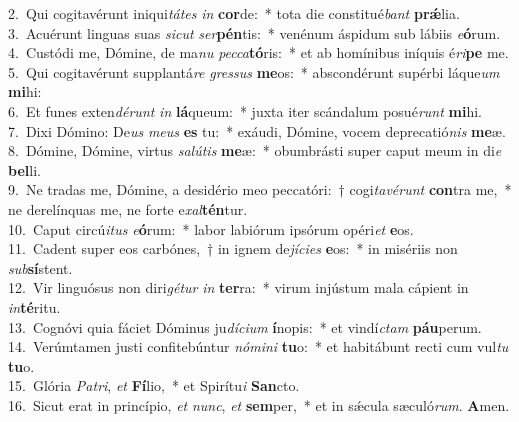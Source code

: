 {2.~}Qui cogitavérunt iniqui\textit{tá}\textit{tes} \textit{in} \textbf{cor}de:~* tota die constitué\textit{bant} \textbf{prǽ}lia.\\
{3.~}Acuérunt linguas suas \textit{si}\textit{cut} \textit{ser}\textbf{pén}tis:~* venénum áspidum sub lábiis \textit{e}\textbf{ó}rum.\\
{4.~}Custódi me, Dómine, de ma\textit{nu} \textit{pec}\textit{ca}\textbf{tó}ris:~* et ab homínibus iníquis é\textit{ri}\textbf{pe} me.\\
{5.~}Qui cogitavérunt supplantá\textit{re} \textit{gres}\textit{sus} \textbf{me}os:~* abscondérunt supérbi láque\textit{um} \textbf{mi}hi:\\
{6.~}Et funes exten\textit{dé}\textit{runt} \textit{in} \textbf{lá}queum:~* juxta iter scándalum posué\textit{runt} \textbf{mi}hi.\\
{7.~}Dixi Dómino: De\textit{us} \textit{me}\textit{us} \textbf{es} tu:~* exáudi, Dómine, vocem deprecatió\textit{nis} \textbf{me}æ.\\
{8.~}Dómine, Dómine, virtus \textit{sa}\textit{lú}\textit{tis} \textbf{me}æ:~* obumbrásti super caput meum in di\textit{e} \textbf{bel}li.\\
{9.~}Ne tradas me, Dómine, a desidério meo peccatóri:~† cogi\textit{ta}\textit{vé}\textit{runt} \textbf{con}tra me,~* ne derelínquas me, ne forte e\textit{xal}\textbf{tén}tur.\\
{10.~}Caput circú\textit{i}\textit{tus} \textit{e}\textbf{ó}rum:~* labor labiórum ipsórum opéri\textit{et} \textbf{e}os.\\
{11.~}Cadent super eos carbónes,~† in ignem de\textit{jí}\textit{ci}\textit{es} \textbf{e}os:~* in misériis non \textit{sub}\textbf{sí}stent.\\
{12.~}Vir linguósus non diri\textit{gé}\textit{tur} \textit{in} \textbf{ter}ra:~* virum injústum mala cápient in \textit{in}\textbf{té}ritu.\\
{13.~}Cognóvi quia fáciet Dóminus ju\textit{dí}\textit{ci}\textit{um} \textbf{í}nopis:~* et vindí\textit{ctam} \textbf{páu}perum.\\
{14.~}Verúmtamen justi confitebúntur \textit{nó}\textit{mi}\textit{ni} \textbf{tu}o:~* et habitábunt recti cum vul\textit{tu} \textbf{tu}o.\\
{15.~}Glória \textit{Pa}\textit{tri}, \textit{et} \textbf{Fí}lio,~* et Spirítu\textit{i} \textbf{San}cto.\\
{16.~}Sicut erat in princípio, \textit{et} \textit{nunc}, \textit{et} \textbf{sem}per,~* et in sǽcula sæculó\textit{rum}. \textbf{A}men.\\
